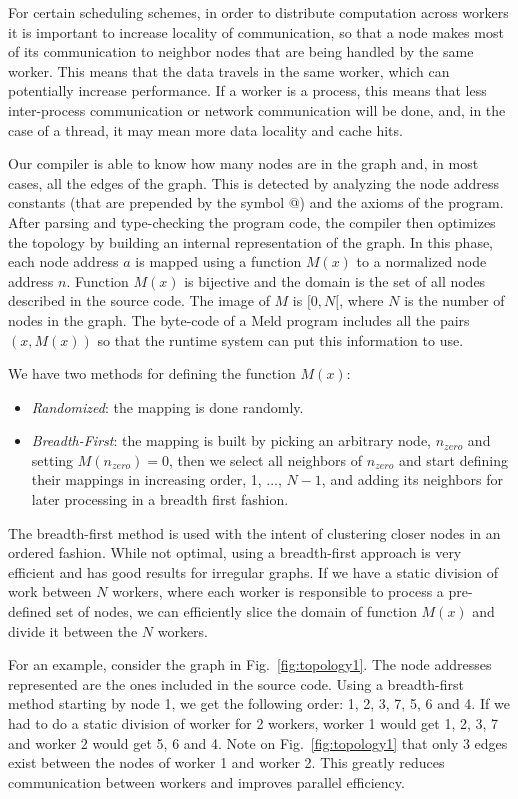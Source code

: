 \documentclass[preprint]{sigplanconf}
\begin{document}
For certain scheduling schemes, in order to distribute computation across workers it is important
to increase locality of communication, so that a node makes most of its communication to
neighbor nodes that are being handled by the same worker. This means that the data travels
in the same worker, which can potentially increase performance. If a worker is a process,
this means that less inter-process communication or network communication will be done, and,
in the case of a thread, it may mean more data locality and cache hits.

Our compiler is able to know how many nodes are in the graph and, in most cases, all the
edges of the graph. This is detected by analyzing the node address constants (that are prepended
by the symbol @) and the axioms of the program. After parsing and type-checking the program code,
the compiler then optimizes the topology by building an internal representation of the graph.
In this phase, each node address $a$ is mapped using a function $M(x)$ to a normalized node
address $n$. Function $M(x)$ is bijective and the domain is the set of all nodes described in the
source code. The image of $M$ is $[0, N[$, where $N$ is the number
of nodes in the graph. The byte-code of a Meld program includes all the pairs $(x, M(x))$ so
that the runtime system can put this information to use.

We have two methods for defining the function $M(x)$:

\begin{itemize}
   \item \emph{Randomized}: the mapping is done randomly.
   \item \emph{Breadth-First}: the mapping is built by picking an arbitrary node, $n_{zero}$
   and setting $M(n_{zero}) = 0$, then we select all neighbors of $n_{zero}$ and start defining
   their mappings in increasing order, 1, ..., $N-1$, and adding its neighbors for later processing
   in a breadth first fashion.
\end{itemize}

The breadth-first method is used with the intent of clustering closer nodes in an ordered fashion.
While not optimal, using a breadth-first approach is very efficient and has good results for
irregular graphs. If we have a static division of work between $N$ workers, where each worker
is responsible to process a pre-defined set of nodes, we can efficiently slice the domain of function
$M(x)$ and divide it between the $N$ workers.

For an example, consider the graph in Fig.~\ref{fig:topology1}. The node addresses represented
are the ones included in the source code. Using a breadth-first method starting by node 1,
we get the following order: 1, 2, 3, 7, 5, 6 and 4. If we had to do a static division of worker
for 2 workers, worker 1 would get 1, 2, 3, 7 and worker 2 would get 5, 6 and 4. Note on
Fig.~\ref{fig:topology1} that only 3 edges exist between the nodes of worker 1 and worker 2.
This greatly reduces communication between workers and improves parallel efficiency.
\end{document}

